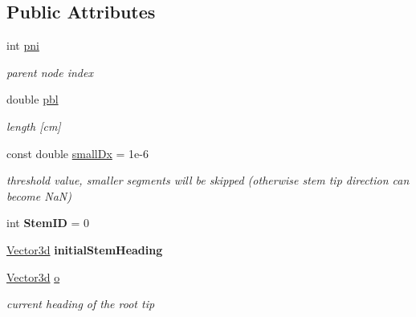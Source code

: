\subsection*{Public Attributes}
\begin{DoxyCompactItemize}
\item 
\mbox{\label{classCPlantBox_1_1Stem_a75d45d64ca2fb58989822c22e47d49f1}} 
int \hyperlink{classCPlantBox_1_1Stem_a75d45d64ca2fb58989822c22e47d49f1}{pni}
\begin{DoxyCompactList}\small\item\em parent node index \end{DoxyCompactList}\item 
\mbox{\label{classCPlantBox_1_1Stem_a8dcdb15ac2aecd71c7ae1c5b8882e72b}} 
double \hyperlink{classCPlantBox_1_1Stem_a8dcdb15ac2aecd71c7ae1c5b8882e72b}{pbl}
\begin{DoxyCompactList}\small\item\em length \mbox{[}cm\mbox{]} \end{DoxyCompactList}\item 
\mbox{\label{classCPlantBox_1_1Stem_a9cfa0e428646bcc7764fd6f71aee438d}} 
const double \hyperlink{classCPlantBox_1_1Stem_a9cfa0e428646bcc7764fd6f71aee438d}{small\+Dx} = 1e-\/6
\begin{DoxyCompactList}\small\item\em threshold value, smaller segments will be skipped (otherwise stem tip direction can become NaN) \end{DoxyCompactList}\item 
\mbox{\label{classCPlantBox_1_1Stem_a7137304dd7c3778e1bb9b650ed82d349}} 
int {\bfseries Stem\+ID} = 0
\item 
\mbox{\label{classCPlantBox_1_1Stem_a0cc3ee8dec8b4c2c3d7faac44c4533c3}} 
\hyperlink{classCPlantBox_1_1Vector3d}{Vector3d} {\bfseries initial\+Stem\+Heading}
\item 
\mbox{\label{classCPlantBox_1_1Stem_abd1695ab6a0430f769f27bf78c60ef9d}} 
\hyperlink{classCPlantBox_1_1Vector3d}{Vector3d} \hyperlink{classCPlantBox_1_1Stem_abd1695ab6a0430f769f27bf78c60ef9d}{o}
\begin{DoxyCompactList}\small\item\em current heading of the root tip \end{DoxyCompactList}\item 

\end{DoxyCompactItemize}
